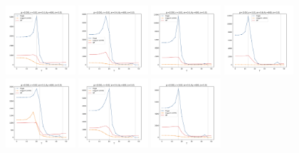 \documentclass[a4paper]{article}
\begin{document}
\begin{figure}[H]
  \centering
  \includegraphics[width=0.23\textwidth]{grid-g3-v1-w1_0}
  \includegraphics[width=0.23\textwidth]{grid-g3-v1-w2_0}
  \includegraphics[width=0.23\textwidth]{grid-g3-v1-w3_0}
  \includegraphics[width=0.23\textwidth]{grid-g3-v1-w4_0}
  \\
  \includegraphics[width=0.23\textwidth]{grid-g3-v2-w1_0}
  \includegraphics[width=0.23\textwidth]{grid-g3-v2-w2_0}
  \includegraphics[width=0.23\textwidth]{grid-g3-v2-w3_0}

\end{figure}
\end{document}
